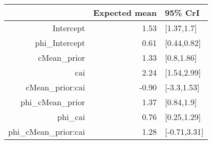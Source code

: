 \begin{tabular}{rrl}
  \hline
 & Expected mean & 95\% CrI \\ 
  \hline
Intercept & 1.53 & [1.37,1.7] \\ 
  phi\_Intercept & 0.61 & [0.44,0.82] \\ 
  cMean\_prior & 1.33 & [0.8,1.86] \\ 
  cai & 2.24 & [1.54,2.99] \\ 
  cMean\_prior:cai & -0.90 & [-3.3,1.53] \\ 
  phi\_cMean\_prior & 1.37 & [0.84,1.9] \\ 
  phi\_cai & 0.76 & [0.25,1.29] \\ 
  phi\_cMean\_prior:cai & 1.28 & [-0.71,3.31] \\ 
   \hline
\end{tabular}


